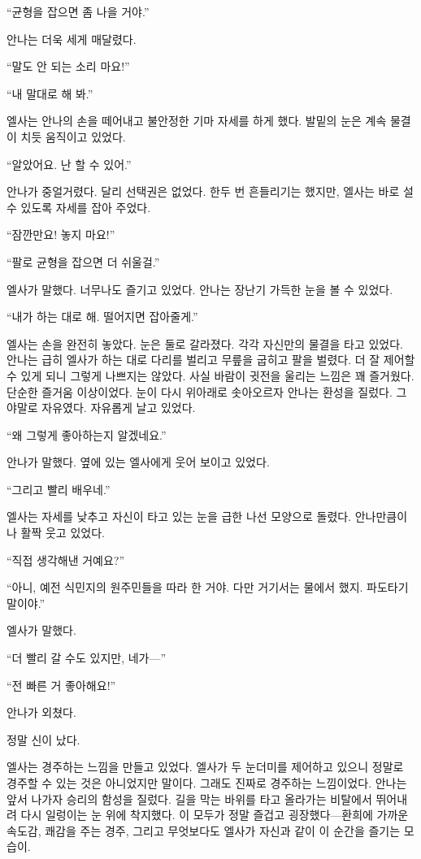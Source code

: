 ``균형을 잡으면 좀 나을 거야.''

안나는 더욱 세게 매달렸다.

``말도 안 되는 소리 마요!''

``내 말대로 해 봐.''

엘사는 안나의 손을 떼어내고 불안정한 기마 자세를 하게 했다. 발밑의 눈은 계속 물결이 치듯 움직이고 있었다.

``알았어요. 난 할 수 있어.''

안나가 중얼거렸다. 달리 선택권은 없었다. 한두 번 흔들리기는 했지만, 엘사는 바로 설 수 있도록 자세를 잡아 주었다.

``잠깐만요! 놓지 마요!''

``팔로 균형을 잡으면 더 쉬울걸.''

엘사가 말했다. 너무나도 즐기고 있었다. 안나는 장난기 가득한 눈을 볼 수 있었다.

``내가 하는 대로 해. 떨어지면 잡아줄게.''

엘사는 손을 완전히 놓았다. 눈은 둘로 갈라졌다. 각각 자신만의 물결을 타고 있었다. 안나는 급히 엘사가 하는 대로 다리를 벌리고 무릎을 굽히고 팔을 벌렸다. 더 잘 제어할 수 있게 되니 그렇게 나쁘지는 않았다. 사실 바람이 귓전을 울리는 느낌은 꽤 즐거웠다. 단순한 즐거움 이상이었다. 눈이 다시 위아래로 솟아오르자 안나는 환성을 질렀다. 그야말로 자유였다. 자유롭게 날고 있었다.

``왜 그렇게 좋아하는지 알겠네요.''

안나가 말했다. 옆에 있는 엘사에게 웃어 보이고 있었다.

``그리고 빨리 배우네.''

엘사는 자세를 낮추고 자신이 타고 있는 눈을 급한 나선 모양으로 돌렸다. 안나만큼이나 활짝 웃고 있었다.

``직접 생각해낸 거예요?''

``아니, 예전 식민지의 원주민들을 따라 한 거야. 다만 거기서는 물에서 했지. 파도타기 말이야.''

엘사가 말했다.

``더 빨리 갈 수도 있지만, 네가—''

``전 빠른 거 좋아해요!''

안나가 외쳤다.

정말 신이 났다.

엘사는 경주하는 느낌을 만들고 있었다. 엘사가 두 눈더미를 제어하고 있으니 정말로 경주할 수 있는 것은 아니었지만 말이다. 그래도 진짜로 경주하는 느낌이었다. 안나는 앞서 나가자 승리의 함성을 질렀다. 길을 막는 바위를 타고 올라가는 비탈에서 뛰어내려 다시 일렁이는 눈 위에 착지했다. 이 모두가 정말 즐겁고 굉장했다—환희에 가까운 속도감, 쾌감을 주는 경주, 그리고 무엇보다도 엘사가 자신과 같이 이 순간을 즐기는 모습이.

